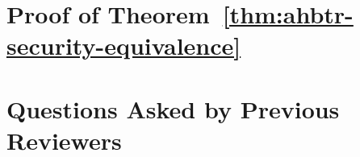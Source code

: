 \documentclass[
  layout=6x9,
  envelope-icons=no,
  format=lncs-submission-draft
]{crypto-paper}
\begin{document}




\LaomianBody















\LaomianAcknowledgments


\LaomianAppendix

% 

\section{Proof of Theorem~\ref{thm:ahbtr-security-equivalence}}
\label{sec:deferred}



\section{Questions Asked by Previous Reviewers}
\label{sec:faq}


\end{document}
